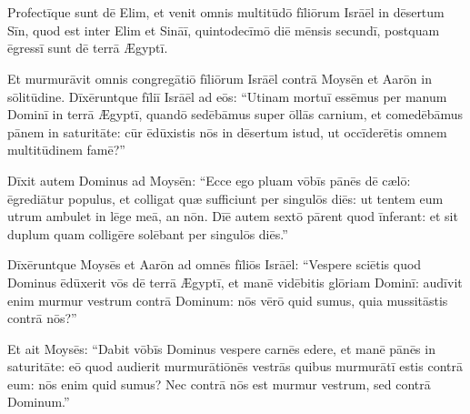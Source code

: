 \chapter{}


\thispagestyle{empty}

Profectīque sunt dē Elim, et venit omnis multitūdō fīliōrum
Isrāēl in dēsertum Sīn, quod est inter Elim et Sināī,
quintodecīmō diē mēnsis secundī, postquam ēgressī sunt dē terrā Ægyptī.

Et murmurāvit omnis congregātiō fīliōrum
Isrāēl contrā Moysēn et Aarōn in sōlitūdine. Dīxēruntque fīliī Isrāēl ad eōs:
``Utinam mortuī essēmus per manum Dominī in terrā Ægyptī, quandō sedēbāmus
super ōllās carnium, et comedēbāmus pānem in saturitāte: cūr ēdūxistis nōs in
dēsertum istud, ut occīderētis omnem multitūdinem famē?''

Dīxit autem
Dominus ad Moysēn: ``Ecce ego pluam vōbīs pānēs
dē cælō: ēgrediātur populus, et colligat quæ
sufficiunt per singulōs diēs: ut
tentem eum utrum ambulet in lēge meā, an nōn. Dīē autem
sextō pārent quod īnferant: et sit duplum
quam colligēre solēbant per singulōs diēs.''

Dīxēruntque Moysēs et Aarōn ad omnēs fīliōs Isrāēl: ``Vespere sciētis
quod Dominus ēdūxerit vōs dē terrā Ægyptī, et manē vidēbitis glōriam
Dominī: audīvit enim murmur vestrum contrā Dominum: nōs
vērō quid sumus, quia mussitāstis contrā nōs?''

Et ait Moysēs: ``Dabit vōbīs Dominus vespere carnēs edere, et manē pānēs in
saturitāte: eō quod audierit murmurātiōnēs
vestrās quibus murmurātī estis contrā eum: nōs enim
quid sumus? Nec contrā nōs est murmur vestrum, sed contrā Dominum.''

